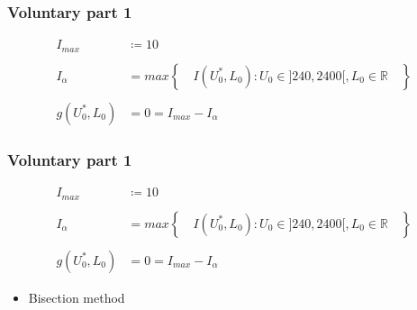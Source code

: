 \documentclass[aspectratio=1610]{beamer}
\begin{document}
\begin{frame}
\frametitle{Voluntary part 1}
	\begin{align*}
		I_{max}&\coloneqq 10\\ \\
		I_{\alpha} &= max \left\lbrace \quad I(U^{*}_{0},L_{0}):U_{0}	\in]240,2400[,L_{0}\in \mathbb{R} \quad\right\rbrace\\ \\
		g(U^{*}_{0},L_{0})&=0=I_{max}-I_{\alpha}
	\end{align*}
\end{frame}
\begin{frame}
\frametitle{Voluntary part 1}
	\begin{align*}
		I_{max}&\coloneqq 10\\ \\
		I_{\alpha} &= max \left\lbrace \quad I(U^{*}_{0},L_{0}):U_{0}	\in]240,2400[,L_{0}\in \mathbb{R} \quad\right\rbrace\\ \\
		g(U^{*}_{0},L_{0})&=0=I_{max}-I_{\alpha}
	\end{align*}
\begin{itemize}
	\item<1-> Bisection method
\end{itemize}
\end{frame}
\end{document}
